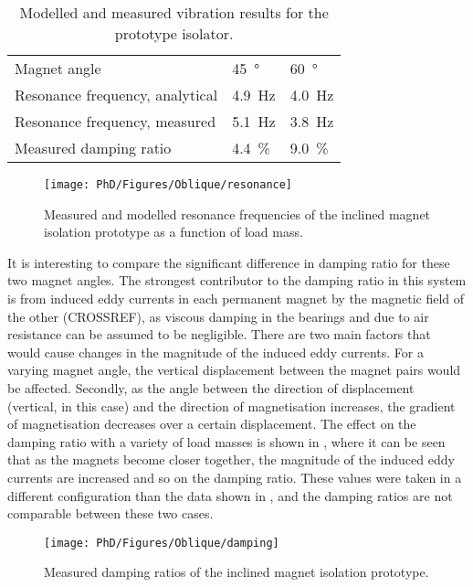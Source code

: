\documentclass[11pt,a4paper]{memoir}
\begin{document}
\begin{table}
\caption{Modelled and measured vibration results for the prototype isolator.}
\begin{tabular}{@{}lll@{}}
\toprule
Magnet angle & \SI{45}{\degree} & \SI{60}{\degree} \\
Resonance frequency, analytical & \SI{4.9}{Hz} & \SI{4.0}{Hz} \\
Resonance frequency, measured & \SI{5.1}{Hz} & \SI{3.8}{Hz} \\
Measured damping ratio & \SI{4.4}{\%} & \SI{9.0}{\%} \\
\bottomrule
\end{tabular}
\end{table}

\begin{figure}
\centering
\texttt{[image: PhD/Figures/Oblique/resonance]}
\caption{Measured and modelled resonance frequencies of the inclined magnet isolation prototype as a function of load mass.}
\end{figure}

It is interesting to compare the significant difference in damping ratio for these two magnet angles.
The strongest contributor to the damping ratio in this system is from induced eddy currents in each permanent magnet by the magnetic field of the other (CROSSREF), as viscous damping in the bearings and due to air resistance can be assumed to be negligible.
There are two main factors that would cause changes in the magnitude of the induced eddy currents.
For a varying magnet angle, the vertical displacement between the magnet pairs would be affected.
Secondly, as the angle between the direction of displacement (vertical, in this case) and the direction of magnetisation increases, the gradient of magnetisation decreases over a certain displacement.
The effect on the damping ratio with a variety of load masses is shown in , where it can be seen that as the magnets become closer together, the magnitude of the induced eddy currents are increased and so on the damping ratio.
These values were taken in a different configuration than the data shown in , and the damping ratios are not comparable between these two cases.

\begin{figure}
\centering
\texttt{[image: PhD/Figures/Oblique/damping]}
\caption{Measured damping ratios of the inclined magnet isolation prototype.}
\end{figure}
\end{document}
